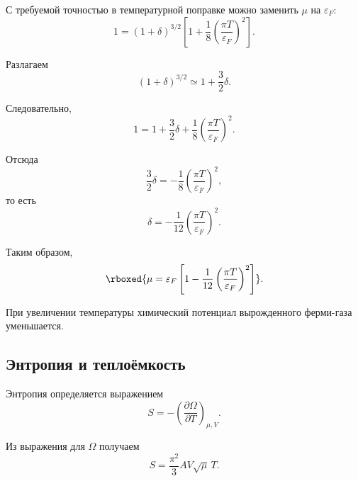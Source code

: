 \documentclass[../final.tex]{subfiles}
\begin{document}
С требуемой точностью в температурной поправке можно заменить
$\mu$ на $\varepsilon_F$:
%
\begin{equation*}
    1
    =
    (1+\delta)^{3/2}
    \left[
        1
        +
        \frac{1}{8}
        \left(
            \frac{\pi T}{\varepsilon_F}
        \right)^2
    \right].
\end{equation*}

Разлагаем
%
\begin{equation*}
    (1+\delta)^{3/2}
    \simeq
    1
    +
    \frac{3}{2}\delta.
\end{equation*}

Следовательно,
%
\begin{equation*}
    1
    =
    1
    +
    \frac{3}{2}\delta
    +
    \frac{1}{8}
    \left(
        \frac{\pi T}{\varepsilon_F}
    \right)^2.
\end{equation*}

Отсюда
%
\begin{equation*}
    \frac{3}{2}\delta
    =
    -
    \frac{1}{8}
    \left(
        \frac{\pi T}{\varepsilon_F}
    \right)^2,
\end{equation*}
%
то есть
%
\begin{equation*}
    \delta
    =
    -
    \frac{1}{12}
    \left(
        \frac{\pi T}{\varepsilon_F}
    \right)^2.
\end{equation*}

Таким образом,
%
\[
    \rboxed{
        \mu
        =
        \varepsilon_F
        \left[
            1
            -
            \frac{1}{12}
            \left(
                \frac{\pi T}{\varepsilon_F}
            \right)^2
        \right]
    }.
\]

При увеличении температуры химический потенциал вырожденного
ферми-газа уменьшается.


\subsection{Энтропия и теплоёмкость}

Энтропия определяется выражением
%
\begin{equation*}
    S
    =
    -
    \left(
        \frac{\partial\Omega}{\partial T}
    \right)_{\mu,V}.
\end{equation*}

Из выражения для $\Omega$ получаем
%
\begin{equation*}
    S
    =
    \frac{\pi^2}{3}
    AV\sqrt{\mu}\,T.
\end{equation*}
\end{document}
